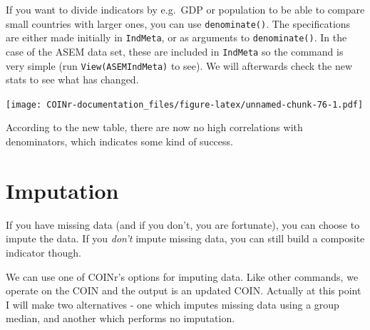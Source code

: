 \documentclass[
]{book}
\newenvironment{Shaded}{\begin{snugshade}}{\end{snugshade}}
\newcommand{\AttributeTok}[1]{\textcolor[rgb]{0.77,0.63,0.00}{#1}}
\newcommand{\CommentTok}[1]{\textcolor[rgb]{0.56,0.35,0.01}{\textit{#1}}}
\newcommand{\DocumentationTok}[1]{\textcolor[rgb]{0.56,0.35,0.01}{\textbf{\textit{#1}}}}
\newcommand{\FunctionTok}[1]{\textcolor[rgb]{0.00,0.00,0.00}{#1}}
\newcommand{\NormalTok}[1]{#1}
\newcommand{\OtherTok}[1]{\textcolor[rgb]{0.56,0.35,0.01}{#1}}
\newcommand{\SpecialCharTok}[1]{\textcolor[rgb]{0.00,0.00,0.00}{#1}}
\newcommand{\StringTok}[1]{\textcolor[rgb]{0.31,0.60,0.02}{#1}}
\begin{document}
If you want to divide indicators by e.g.~GDP or population to be able to compare small countries with larger ones, you can use \texttt{denominate()}. The specifications are either made initially in \texttt{IndMeta}, or as arguments to \texttt{denominate()}. In the case of the ASEM data set, these are included in \texttt{IndMeta} so the command is very simple (run \texttt{View(ASEMIndMeta)} to see). We will afterwards check the new stats to see what has changed.

\begin{Shaded}
\end{Shaded}

\texttt{[image: COINr-documentation\_files/figure-latex/unnamed-chunk-76-1.pdf]}

According to the new table, there are now no high correlations with denominators, which indicates some kind of success.

\hypertarget{imputation}{%
\section{Imputation}\label{imputation}}

If you have missing data (and if you don't, you are fortunate), you can choose to impute the data. If you \emph{don't} impute missing data, you can still build a composite indicator though.

We can use one of COINr's options for imputing data. Like other commands, we operate on the COIN and the output is an updated COIN. Actually at this point I will make two alternatives - one which imputes missing data using a group median, and another which performs no imputation.
\end{document}
